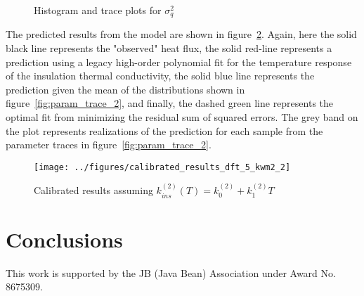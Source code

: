 \documentclass[article]{proc}
\begin{document}
        \begin{figure}[b!]
            \centering
            \qquad
            \caption{Histogram and trace plots for $\sigma_q^2$}
            \label{fig:sigma_trace_2}
        \end{figure}

        The predicted results from the model are shown in figure~\ref{fig:cal_results_2}. Again, here the solid black line represents the "observed" heat flux, the solid red-line represents a prediction using a legacy high-order polynomial fit for the temperature response of the insulation thermal conductivity, the solid blue line represents the prediction given the mean of the distributions shown in figure~\ref{fig:param_trace_2}, and finally, the dashed green line represents the optimal fit from minimizing the residual sum of squared errors. The grey band on the plot represents realizations of the prediction for each sample from the parameter traces in figure~\ref{fig:param_trace_2}. 

        \begin{figure}[h!]
            \centering
            \texttt{[image: ../figures/calibrated\_results\_dft\_5\_kwm2\_2]}
            \caption{Calibrated results assuming $k^{(2)}_{ins}(T) = k^{(2)}_0 + k^{(2)}_1 T$}
            \label{fig:cal_results_2}
        \end{figure}


\section{Conclusions}



\acknowledgements

This work is supported by the JB (Java Bean) Association under Award No. 8675309.


\scriptsize{

}
\end{document}
